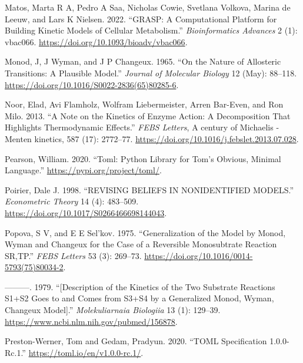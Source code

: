 \documentclass[
  letterpaper,
  DIV=11,
  numbers=noendperiod]{scrartcl}
\newlength{\cslhangindent}
\newlength{\cslentryspacingunit} %
\newenvironment{CSLReferences}[2] %
 {%
  \setlength{\parindent}{0pt}
  \ifodd #1
  \let\oldpar\par
  \def\par{\hangindent=\cslhangindent\oldpar}
  \fi
  \setlength{\parskip}{#2\cslentryspacingunit}
 }%
 {}
\begin{document}
\begin{CSLReferences}{1}{0}
\leavevmode{}%
Matos, Marta R A, Pedro A Saa, Nicholas Cowie, Svetlana Volkova, Marina
de Leeuw, and Lars K Nielsen. 2022. {``{GRASP}: A Computational Platform
for Building Kinetic Models of Cellular Metabolism.''}
\emph{Bioinformatics Advances} 2 (1): vbac066.
\url{https://doi.org/10.1093/bioadv/vbac066}.

\leavevmode{}%
Monod, J, J Wyman, and J P Changeux. 1965. {``On the Nature of
Allosteric Transitions: A Plausible Model.''} \emph{Journal of Molecular
Biology} 12 (May): 88--118.
\url{https://doi.org/10.1016/S0022-2836(65)80285-6}.

\leavevmode{}%
Noor, Elad, Avi Flamholz, Wolfram Liebermeister, Arren Bar-Even, and Ron
Milo. 2013. {``A Note on the Kinetics of Enzyme Action: {A}
Decomposition That Highlights Thermodynamic Effects.''} \emph{FEBS
Letters}, A century of {Michaelis} - {Menten} kinetics, 587 (17):
2772--77. \url{https://doi.org/10.1016/j.febslet.2013.07.028}.

\leavevmode{}%
Pearson, William. 2020. {``Toml: {Python Library} for {Tom}'s {Obvious},
{Minimal Language}.''} \url{https://pypi.org/project/toml/}.

\leavevmode{}%
Poirier, Dale J. 1998. {``{REVISING} {BELIEFS} {IN} {NONIDENTIFIED}
{MODELS}.''} \emph{Econometric Theory} 14 (4): 483--509.
\url{https://doi.org/10.1017/S0266466698144043}.

\leavevmode{}%
Popova, S V, and E E Sel'kov. 1975. {``Generalization of the Model by
{Monod}, {Wyman} and {Changeux} for the Case of a Reversible
Monosubtrate Reaction {SR},{TP}.''} \emph{FEBS Letters} 53 (3): 269--73.
\url{https://doi.org/10.1016/0014-5793(75)80034-2}.

\leavevmode{}%
---------. 1979. {``{[}{Description} of the Kinetics of the Two
Substrate Reactions {S1}+{S2} Goes to and Comes from {S3}+{S4} by a
Generalized {Monod}, {Wyman}, {Changeux} Model{]}.''}
\emph{Molekuliarnaia Biologiia} 13 (1): 129--39.
\url{https://www.ncbi.nlm.nih.gov/pubmed/156878}.

\leavevmode{}%
Preston-Werner, Tom and Gedam, Pradyun. 2020. {``{TOML Specification}
1.0.0-Rc.1.''} \url{https://toml.io/en/v1.0.0-rc.1/}.


\end{CSLReferences}
\end{document}
